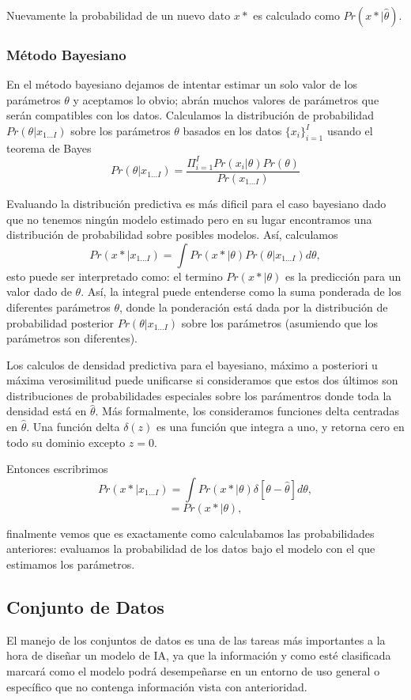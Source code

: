 \documentclass[letter,12pt]{report}
\begin{document}
Nuevamente la probabilidad de un nuevo dato $x*$ es calculado como $Pr(x*|\hat\theta)$.

\subsubsection{Método Bayesiano}
En el método bayesiano dejamos de intentar estimar un solo valor de los parámetros
$\theta$ y aceptamos lo obvio; abrán muchos valores de parámetros que serán
compatibles con los datos. Calculamos la distribución de probabilidad
$Pr(\theta|x_{1...I})$ sobre los parámetros $\theta$ basados en los datos
$\{x_i\}_{i=1}^I$ usando el teorema de Bayes
$$Pr(\theta|x_{1...I})=\frac{\Pi_{i=1}^I
Pr(x_i|\theta)Pr(\theta)}{Pr(x_{1...I})}$$

Evaluando la distribución predictiva es más dificil para el caso bayesiano dado que no
tenemos ningún modelo estimado pero en su lugar encontramos una distribución de
probabilidad sobre posibles modelos. Así, calculamos
$$Pr(x*|x_{1...I})=\int Pr(x*|\theta) Pr(\theta|x_{1...I})d\theta,$$
esto puede ser interpretado como: el termino $Pr(x*|\theta)$ es la predicción para un
valor dado de $\theta$. Así, la integral puede entenderse como la suma ponderada de los
diferentes parámetros $\theta$, donde la ponderación está dada por la distribución de
probabilidad posterior $Pr(\theta|x_{1...I})$ sobre los parámetros (asumiendo que
los parámetros son diferentes).

Los calculos de densidad predictiva para el bayesiano, máximo a posteriori u máxima
verosimilitud puede unificarse si consideramos que estos dos últimos son distribuciones
de probabilidades especiales sobre los parámentros donde toda la densidad está en
$\hat\theta$. Más formalmente, los consideramos funciones delta centradas en
$\hat\theta$. Una función delta $\delta(z)$ es una función que integra a uno, y retorna
cero en todo su dominio excepto $z=0$.

Entonces escribrimos
$$Pr(x*|x_{1...I})=\int Pr(x*|\theta) \delta[\theta - \hat\theta]d\theta,$$
$$=Pr(x*|\theta),$$

finalmente vemos que es exactamente como calculabamos las probabilidades anteriores:
evaluamos la probabilidad de los datos bajo el modelo con el que estimamos los
parámetros.

\subsection{Conjunto de Datos}
El manejo de los conjuntos de datos es una de las tareas más importantes a la hora de
diseñar un modelo de IA, ya que la información y como esté clasificada marcará como el
modelo podrá desempeñarse en un entorno de uso general o específico que no contenga
información vista con anterioridad.
\end{document}
